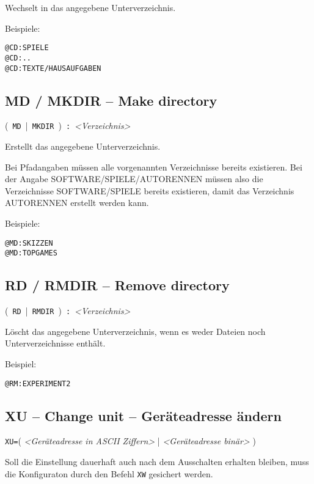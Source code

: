 \documentclass[10pt,a4paper]{scrartcl}		%
\begin{document}
Wechselt in das angegebene Unterverzeichnis.

Beispiele:
\begin{verbatim}
@CD:SPIELE
@CD:..
@CD:TEXTE/HAUSAUFGABEN
\end{verbatim}

\subsection{MD / MKDIR -- Make directory}

\mbox{\Big( \texttt{MD} \Big| \texttt{MKDIR} \Big) 
\texttt{:} \textit{<Verzeichnis>}}

Erstellt das angegebene Unterverzeichnis. 

Bei Pfadangaben müssen
alle vorgenannten Verzeichnisse bereits existieren. Bei der
Angabe SOFTWARE/SPIELE/AUTORENNEN müssen also die Verzeichnisse
SOFTWARE/SPIELE bereits existieren, damit das Verzeichnis AUTORENNEN 
erstellt werden kann.

Beispiele:
\begin{verbatim}
@MD:SKIZZEN
@MD:TOPGAMES
\end{verbatim}



\subsection{RD / RMDIR -- Remove directory}

\mbox{\Big( \texttt{RD} \Big| \texttt{RMDIR} \Big) 
\texttt{:} \textit{<Verzeichnis>}}

Löscht das angegebene Unterverzeichnis, wenn es weder
Dateien noch Unterverzeichnisse enthält.

Beispiel:
\begin{verbatim}
@RM:EXPERIMENT2
\end{verbatim}




\subsection{XU -- Change unit -- Geräteadresse ändern}

\texttt{XU=}\Big( \textit{<Geräteadresse in ASCII Ziffern>} \Big|
\textit{<Geräteadresse binär>} \Big)

Soll die Einstellung dauerhaft auch nach dem Ausschalten erhalten 
bleiben, muss die Konfiguraton durch den Befehl \texttt{XW} gesichert werden.
\end{document}
